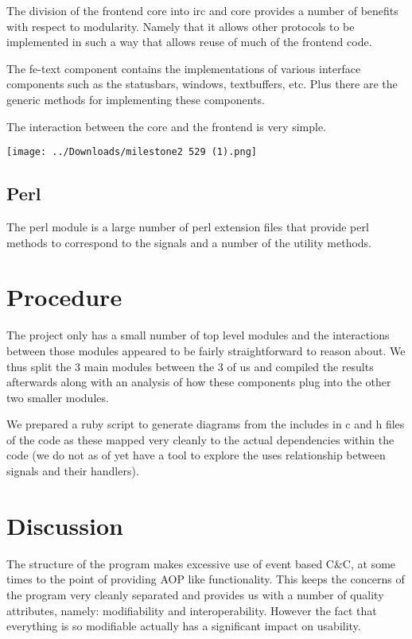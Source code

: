 \documentclass{acm_proc_article-sp}
\begin{document}
The division of the frontend core into irc and core provides a number of benefits with respect to modularity. Namely that it allows other protocols to be implemented in such a way that allows reuse of much of the frontend code.

The fe-text component contains the implementations of various interface components such as the statusbars, windows, textbuffers, etc. Plus there are the generic methods for implementing these components.

The interaction between the core and the frontend is very simple.

\texttt{[image: ../Downloads/milestone2 529 (1).png]} 

\subsection{Perl}
The perl module is a large number of perl extension files that provide perl methods to correspond to the signals and a number of the utility methods.


\section{Procedure}

The project only has a small number of top level modules and the interactions between those modules appeared to be fairly straightforward to reason about. We thus split the 3 main modules between the 3 of us and compiled the results afterwards along with an analysis of how these components plug into the other two smaller modules.

We prepared a ruby script to generate diagrams from the includes in c and h files of the code as these mapped very cleanly to the actual dependencies within the code (we do not as of yet have a tool to explore the uses relationship between signals and their handlers).

\section{Discussion}

The structure of the program makes excessive use of event based C\&C, at some times to the point of providing AOP like functionality. This keeps the concerns of the program very cleanly separated and provides us with a number of quality attributes, namely: modifiability and interoperability. However the fact that everything is so modifiable actually has a significant impact on usability.
\end{document}
